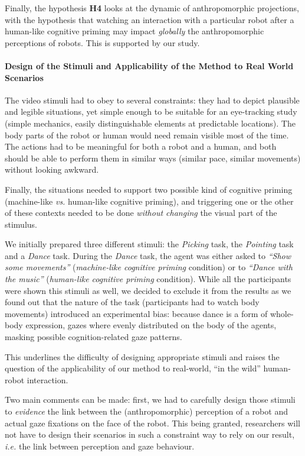 \documentclass[lettersize, noapacite, twoside, HRI]{apa_HRI}
\newcommand{\ie}{\textit{i.e.}\xspace}
\newcommand{\vs}{\textit{vs.}\xspace}
\newcommand{\h}[1]{\textbf{H#1}\xspace}
\begin{document}
Finally, the hypothesis \h{4} looks at the dynamic of anthropomorphic
projections, with the hypothesis that watching an interaction with a particular
robot after a human-like cognitive priming may impact \emph{globally} the
anthropomorphic perceptions of robots. This is supported by our study.

\paragraph{Design of the Stimuli and Applicability of the Method to Real World
Scenarios}
\label{stimuli_design}

The video stimuli had to obey to several constraints: they had to depict
plausible and legible situations, yet simple enough to be suitable for an
eye-tracking study (simple mechanics, easily distinguishable elements at
predictable locations). The body parts of the robot or human would need remain
visible most of the time. The actions had to be meaningful for both a robot and
a human, and both should be able to perform them in similar ways (similar pace,
similar movements) without looking awkward.

Finally, the situations needed to support two possible kind of cognitive priming
(machine-like \vs human-like cognitive priming), and triggering one or the other of these
contexts needed to be done \emph{without changing} the visual part of the
stimulus.

We initially prepared three different stimuli: the \emph{Picking} task, the
\emph{Pointing} task and a \emph{Dance} task.  During the \emph{Dance} task, the
agent was either asked to \emph{``Show some movements''} (\emph{machine-like
cognitive priming} condition) or to \emph{``Dance with the music''}
(\emph{human-like cognitive priming} condition). While all the participants were
shown this stimuli as well, we decided to exclude it from the results as we
found out that the nature of the task (participants had to watch body movements)
introduced an experimental bias: because dance is a form of whole-body
expression, gazes where evenly distributed on the body of the agents, masking
possible cognition-related gaze patterns.

This underlines the difficulty of designing appropriate stimuli and raises the
question of the applicability of our method to real-world, ``in the wild''
human-robot interaction.

Two main comments can be made: first, we had to carefully design those stimuli
to \emph{evidence} the link between the (anthropomorphic) perception of a robot
and actual gaze fixations on the face of the robot. This being granted,
researchers will not have to design their scenarios in such a constraint way to
rely on our result, \ie the link between perception and gaze behaviour.
\end{document}
